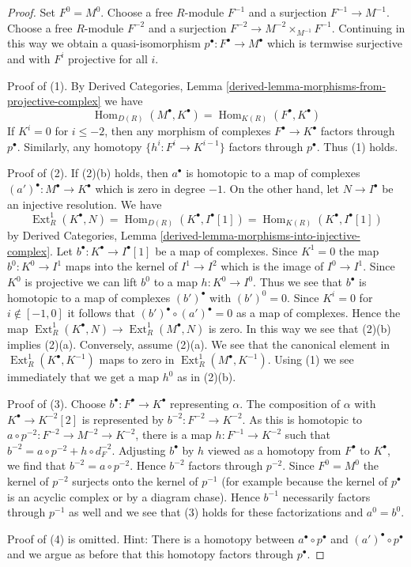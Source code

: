 \documentclass[10pt,a4paper]{amsart}
\theoremstyle{plain}
\theoremstyle{definition}
\theoremstyle{remark}
\numberwithin{equation}{subsection}
\def\Hom{\mathop{\mathrm{Hom}}\nolimits}
\def\Ext{\mathop{\mathrm{Ext}}\nolimits}
\begin{document}
\begin{proof}
Set $F^0 = M^0$.
Choose a free $R$-module $F^{-1}$ and a surjection $F^{-1} \to M^{-1}$.
Choose a free $R$-module $F^{-2}$ and a surjection
$F^{-2} \to M^{-2} \times_{M^{-1}} F^{-1}$. Continuing in this
way we obtain a quasi-isomorphism $p^\bullet : F^\bullet \to M^\bullet$
which is termwise surjective and with $F^i$ projective for all $i$.

\medskip\noindent
Proof of (1). By
Derived Categories, Lemma \ref{derived-lemma-morphisms-from-projective-complex}
we have
$$
\Hom_{D(R)}(M^\bullet, K^\bullet) = \Hom_{K(R)}(F^\bullet, K^\bullet)
$$
If $K^i = 0$ for $i \leq -2$, then any morphism of complexes
$F^\bullet \to K^\bullet$ factors through $p^\bullet$. Similarly, any
homotopy $\{h^i : F^i \to K^{i - 1}\}$ factors through $p^\bullet$.
Thus (1) holds.

\medskip\noindent
Proof of (2). If (2)(b) holds, then $a^\bullet$ is homotopic to a map
of complexes $(a')^\bullet : M^\bullet \to K^\bullet$
which is zero in degree $-1$.
On the other hand, let $N \to I^\bullet$ be an injective resolution.
We have
$$
\Ext^1_R(K^\bullet, N) = \Hom_{D(R)}(K^\bullet, I^\bullet[1]) =
\Hom_{K(R)}(K^\bullet, I^\bullet[1])
$$
by Derived Categories, Lemma
\ref{derived-lemma-morphisms-into-injective-complex}.
Let $b^\bullet : K^\bullet \to I^\bullet[1]$ be a map of complexes.
Since $K^1 = 0$ the map $b^0 : K^0 \to I^1$ maps into the kernel of
$I^1 \to I^2$ which is the image of $I^0 \to I^1$. Since $K^0$ is projective
we can lift $b^0$ to a map $h : K^0 \to I^0$. Thus we see that $b^\bullet$
is homotopic to a map of complexes $(b')^\bullet$ with $(b')^0 = 0$. Since
$K^i = 0$ for $i \not \in [-1, 0]$ it follows that
$(b')^\bullet \circ (a')^\bullet = 0$ as a map of complexes.
Hence the map $\Ext^1_R(K^\bullet, N) \to
\Ext^1_R(M^\bullet, N)$ is zero. In this way we see that (2)(b)
implies (2)(a). Conversely, assume (2)(a). We see that the
canonical element in $\Ext^1_R(K^\bullet, K^{-1})$ maps to
zero in $\Ext^1_R(M^\bullet, K^{-1})$. Using (1) we
see immediately that we get a map $h^0$ as in (2)(b).

\medskip\noindent
Proof of (3). Choose $b^\bullet : F^\bullet \to K^\bullet$ representing
$\alpha$. The composition of $\alpha$ with $K^\bullet \to K^{-2}[2]$ is
represented by $b^{-2} : F^{-2} \to K^{-2}$. As this is homotopic to
$a \circ p^{-2} : F^{-2} \to M^{-2} \to K^{-2}$, there is a map
$h : F^{-1} \to K^{-2}$ such that $b^{-2} = a \circ p^{-2} + h \circ d_F^{-2}$.
Adjusting $b^\bullet$ by $h$ viewed as a homotopy from $F^\bullet$
to $K^\bullet$, we find that $b^{-2} = a \circ p^{-2}$. Hence $b^{-2}$
factors through $p^{-2}$. Since $F^0 = M^0$ the kernel of $p^{-2}$
surjects onto the kernel of $p^{-1}$ (for example because the kernel
of $p^\bullet$ is an acyclic complex or by a diagram chase). Hence $b^{-1}$
necessarily factors through $p^{-1}$ as well and we see that (3)
holds for these factorizations and $a^0 = b^0$.

\medskip\noindent
Proof of (4) is omitted. Hint: There is a homotopy between
$a^\bullet \circ p^\bullet$ and $(a')^\bullet \circ p^\bullet$
and we argue as before that this homotopy factors through $p^\bullet$.
\end{proof}
\end{document}

